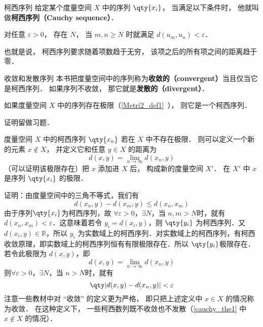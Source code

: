 

\begin{definition}{柯西序列}
给定某个度量空间 $X$ 中的序列 $\qty{x_i}$， 当满足以下条件时， 他就叫做\textbf{柯西序列（Cauchy sequence）}．

对任意 $\varepsilon > 0$， 存在 $N$， 当 $m, n \geqslant N$ 时就满足 $d(u_m, u_n) < \varepsilon$．
\end{definition}
也就是说， 柯西序列要求随着项数趋于无穷， 该项之后的所有项之间的距离趋于零．

\begin{definition}{收敛和发散序列}\label{cauchy_def1}
本书把度量空间中的序列称为\textbf{收敛的（convergent）}当且仅当它是柯西序列． 如果序列不收敛， 那它就是\textbf{发散的（divergent）}．
\end{definition}

\begin{theorem}{}
如果度量空间 $X$ 中的序列存在极限（\autoref{Metri2_def1}~）， 则它是一个柯西序列．
\end{theorem}
证明留做习题．

\begin{theorem}{}\label{cauchy_the1}
度量空间 $X$ 中的柯西序列 $\qty{x_n}$ 若在 $X$ 中不存在极限． 则可以定义一个新的元素 $x \notin X$， 并定义它和任意 $y\in X$ 的距离为
\begin{equation}
d(x, y) = \lim_{n\to\infty} d(x_n, y)
\end{equation}
（可以证明该极限存在）把 $x$ 添加进 $X$ 后， 构成新的度量空间 $X'$． 在 $X'$ 中 $x$ 是序列 $\qty{x_i}$ 的极限．
\end{theorem}
证明：由度量空间中的三角不等式，我们有
\begin{equation}
d(x_n,y)-d(x_m,y)\leq d(x_n,x_m)
\end{equation}
由于序列$\qty{x_i}$为柯西序列，故 $\forall\varepsilon>0$，$\exists N$，当 $n,m>N$时，就有 $d(x_n,x_m)<\varepsilon$．这意味着若令 $y_i=d(x_i,y)$，则 $\qty{y_i}$ 为柯西序列．又 $d(x_i,y)\in \mathbb R$，所以 ${y_i}$ 为实数域上的柯西序列．对实数域上的柯西序列，有柯西收敛原理，即实数域上的柯西序列恒有有限极限存在．所以 $\qty{y_i}$极限存在．若令此极限为 $d(x,y)$，即
\begin{equation}
d(x, y) = \lim_{n\to\infty} d(x_n, y)
\end{equation}
则$\forall\varepsilon>0$，$\exists N$，当 $n>N$时，就有 
\begin{equation}
\qty|d(x,y)-d(x_n,y)|<\varepsilon
\end{equation}
注意一些教材中对 “收敛” 的定义更为严格， 即只把上述定义中 $x \in X$ 的情况称为收敛． 在这种定义下， 一些柯西数列既不收敛也不发散（\autoref{cauchy_the1} 中 $x\notin X$ 的情况）．

